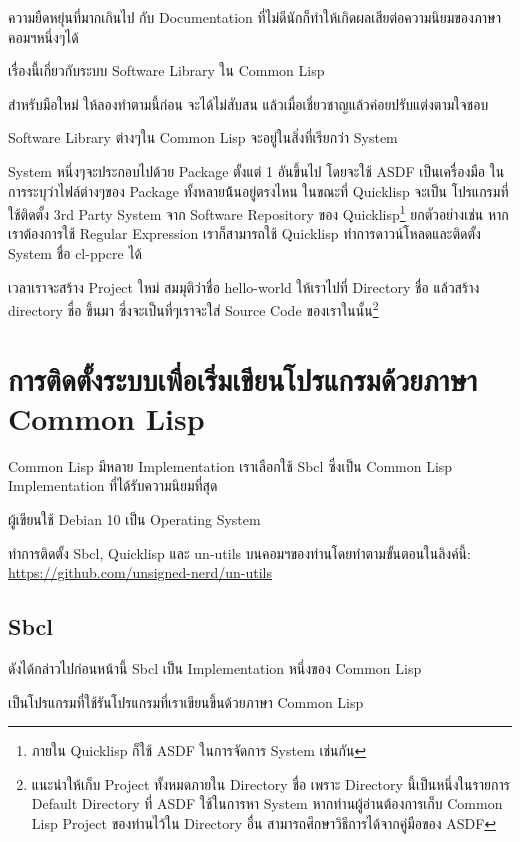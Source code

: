 \documentclass[a4paper]{article}
\begin{document}
ความยืดหยุ่นที่มากเกินไป กับ Documentation ที่ไม่ดีนักก็ทำให้เกิดผลเสียต่อความนิยมของภาษา%
คอมฯหนึ่งๆได้

เรื่องนี้เกี่ยวกับระบบ Software Library ใน Common Lisp

สำหรับมือใหม่ ให้ลองทำตามนี้ก่อน จะได้ไม่สับสน แล้วเมื่อเชี่ยวชาญแล้วค่อยปรับแต่งตามใจชอบ

Software Library ต่างๆใน Common Lisp จะอยู่ในสิ่งที่เรียกว่า System

System หนึ่งๆจะประกอบไปด้วย Package ตั้งแต่ 1 อันขึ้นไป โดยจะใช้ ASDF เป็นเครื่องมือ%
ในการระบุว่าไฟล์ต่างๆของ Package ทั้งหลายน้้นอยู่ตรงไหน ในขณะที่ Quicklisp จะเป็น%
โปรแกรมที่ใช้ติดตั้ง 3rd Party System จาก Software Repository ของ
Quicklisp\footnote{ภายใน Quicklisp ก็ใช้ ASDF ในการจัดการ System เช่นกัน}
ยกตัวอย่างเช่น หากเราต้องการใช้ Regular Expression เราก็สามารถใช้ Quicklisp
ทำการดาวน์โหลดและติดตั้ง System ชื่อ cl-ppcre ได้

เวลาเราจะสร้าง Project ใหม่ สมมุติว่าชื่อ hello-world ให้เราไปที่ Directory ชื่อ
 แล้วสร้าง directory ชื่อ  ขึ้นมา
ซึ่งจะเป็นที่ๆเราจะใส่ Source Code ของเราในนั้น\footnote{แนะนำให้เก็บ Project
ทั้งหมดภายใน Directory ชื่อ  เพราะ Directory นี้เป็นหนึ่งในรายการ
Default Directory ที่ ASDF ใช้ในการหา System หากท่านผู้อ่านต้องการเก็บ Common
Lisp Project ของท่านไว้ใน Directory อื่น สามารถศึกษาวิธีการได้จากคู่มือของ ASDF}

\section{การติดตั้งระบบเพื่อเริ่มเขียนโปรแกรมด้วยภาษา Common Lisp}

Common Lisp มีหลาย Implementation เราเลือกใช้ Sbcl ซึ่งเป็น Common Lisp Implementation ที่ได้รับความนิยมที่สุด

ผู้เขียนใช้ Debian 10 เป็น Operating System

ทำการติดตั้ง Sbcl, Quicklisp และ un-utils บนคอมฯของท่านโดยทำตามขั้นตอนในลิงค์นี้:
\href{https://github.com/unsigned-nerd/un-utils}{https://github.com/unsigned-nerd/un-utils}

\subsection{Sbcl}

ดังได้กล่าวไปก่อนหน้านี้ Sbcl เป็น Implementation หนึ่งของ Common Lisp

เป็นโปรแกรมที่ใช้รันโปรแกรมที่เราเขียนขึ้นด้วยภาษา Common Lisp
\end{document}
